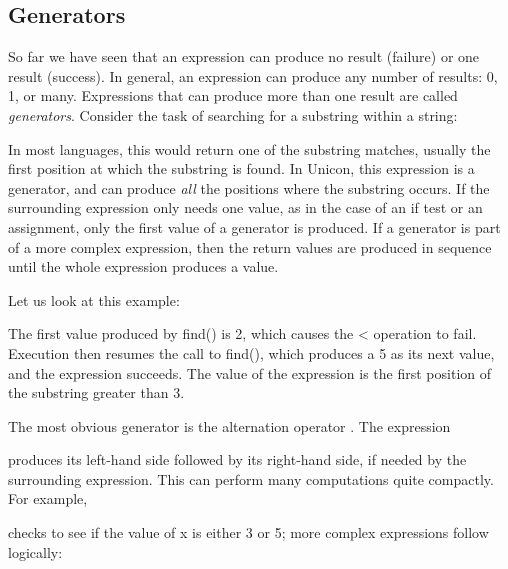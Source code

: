 \subsection[Generators]{Generators}

So far we have seen that an expression can produce no result (failure)
or one result (success). In general, an expression can produce any
number of results: 0, 1, or many. Expressions that can produce more
than one result are called \textit{generators}.
Consider the task of searching for a substring within a string:


In most languages, this would return one of the substring matches,
usually the first position at which the substring is found. In Unicon,
this expression is a generator, and can produce \textit{all} the
positions where the substring occurs. If the surrounding expression
only needs one value, as in the case of an if test or an assignment,
only the first value of a generator is produced. If a generator is part
of a more complex expression, then the return values are produced in
sequence until the whole expression produces a value.

Let us look at this example:


The first value produced by \textsf{find()} is 2, which
causes the \textsf{{\textless}}\textsf{ }operation to fail. Execution
then resumes the call to \textsf{find()}, which produces a 5 as its
next value, and the expression succeeds. The value of the expression is
the first position of the substring greater than 3.

The most obvious generator is the alternation operator \textsf{{\textbar}}. The expression


\noindent
produces its left-hand side followed by its right-hand side, if needed
by the surrounding expression. This can perform many computations quite
compactly. For example,


checks to see if the value of \textsf{x} is either 3 or 5; more complex
expressions follow logically:

